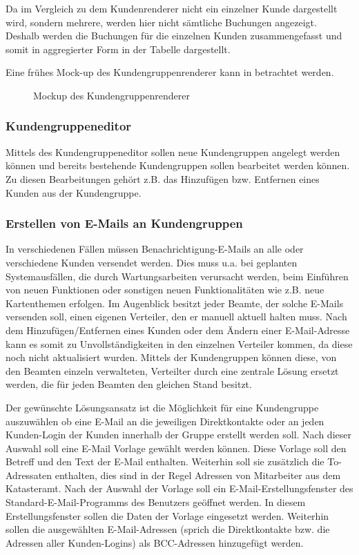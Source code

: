 Da im Vergleich zu dem Kundenrenderer nicht ein einzelner Kunde dargestellt wird, sondern mehrere, werden hier nicht sämtliche Buchungen angezeigt. Deshalb werden die Buchungen für die einzelnen Kunden zusammengefasst und somit in aggregierter Form in der Tabelle dargestellt.

Eine frühes Mock-up des Kundengruppenrenderer kann in  betrachtet werden.
\begin{figure}[htb]
	\centering
	\caption{Mockup des Kundengruppenrenderer}
	\label{fig:mockup-kundengruppenrenderer}
\end{figure}

\subsubsection{Kundengruppeneditor}
Mittels des Kundengruppeneditor sollen neue Kundengruppen angelegt werden können und bereits bestehende Kundengruppen sollen bearbeitet werden können. Zu diesen Bearbeitungen gehört z.B. das Hinzufügen bzw. Entfernen eines Kunden aus der Kundengruppe.

\subsubsection{Erstellen von E-Mails an Kundengruppen}
In verschiedenen Fällen müssen Benachrichtigung-E-Mails an alle oder verschiedene Kunden versendet werden.
Dies muss u.a. bei geplanten Systemausfällen, die durch Wartungsarbeiten verursacht werden, beim Einführen von neuen Funktionen oder sonstigen neuen Funktionalitäten wie z.B. neue Kartenthemen erfolgen.
Im Augenblick besitzt jeder Beamte, der solche E-Mails versenden soll, einen eigenen Verteiler, den er manuell aktuell halten muss.
Nach dem Hinzufügen/Entfernen eines Kunden oder dem Ändern einer E-Mail-Adresse kann es somit zu Unvollständigkeiten in den einzelnen Verteiler kommen, da diese noch nicht aktualisiert wurden.
Mittels der Kundengruppen können diese, von den Beamten einzeln verwalteten, Verteilter durch eine zentrale Lösung ersetzt werden, die für jeden Beamten den gleichen Stand besitzt.

Der gewünschte Lösungsansatz ist die Möglichkeit für eine Kundengruppe auszuwählen ob eine E-Mail an die jeweiligen Direktkontakte oder an jeden Kunden-Login der Kunden innerhalb der Gruppe erstellt werden soll.
Nach dieser Auswahl soll eine E-Mail Vorlage gewählt werden können. Diese Vorlage soll den Betreff und den Text der E-Mail enthalten. Weiterhin soll sie zusätzlich die To-Adressaten enthalten, dies sind in der Regel Adressen von Mitarbeiter aus dem Katasteramt. 
Nach der Auswahl der Vorlage soll ein E-Mail-Erstellungsfenster des Standard-E-Mail-Programms des Benutzers geöffnet werden.
In diesem Erstellungsfenster sollen die Daten der Vorlage eingesetzt werden. Weiterhin sollen die ausgewählten E-Mail-Adressen (sprich die Direktkontakte bzw. die Adressen aller Kunden-Logins) als BCC-Adressen hinzugefügt werden.

